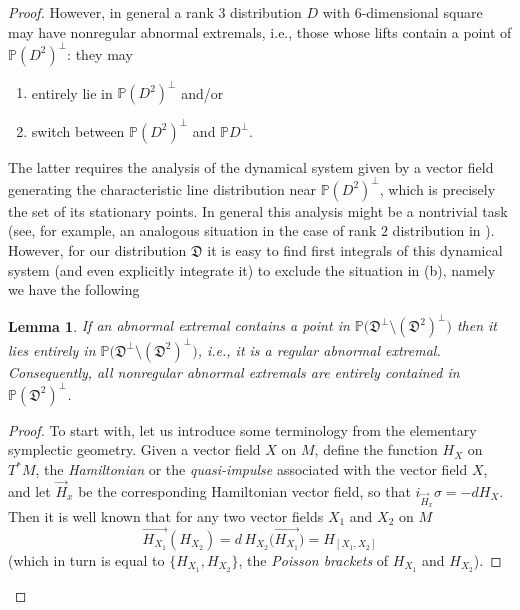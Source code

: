 \documentclass[11pt,letterpaper]{amsart}
\newtheorem{lemma}[theorem]{Lemma}
\numberwithin{equation}{section}
\begin{document}
\begin{proof}
However, in general a rank $3$ distribution $D$ with $6$-dimensional square may have nonregular abnormal extremals, i.e., those whose lifts contain a point of $\mathbb P(D^2)^\perp$: they may 
\begin{enumerate}
\item [(a)] entirely lie in $\mathbb P (D^2)^\perp$ and/or
\item [(b)] switch between $\mathbb P(D^2)^\perp$ and $\mathbb P D^\perp$.
\end{enumerate}
The latter requires the analysis of the dynamical system given by a vector field generating the characteristic line distribution near $\mathbb P(D^2)^\perp$, which is precisely the set of its stationary points. In general this analysis might be a nontrivial task (see, for example, an analogous situation in the case of rank $2$ distribution in \cite{zel99}). However, for our distribution $\mathfrak D$ it is easy to find first integrals of this dynamical system (and even explicitly integrate it) to exclude the situation in (b), namely we have the following
\begin{lemma}
\label{no_b_lemma}
If an abnormal extremal contains a point in $\mathbb P\big(\mathfrak D^\perp\setminus (\mathfrak D^2)^\perp\big)$ then it lies entirely in $\mathbb P\big(\mathfrak D^\perp\setminus (\mathfrak D^2)^\perp\big)$, i.e., it is a regular abnormal extremal. Consequently, all nonregular abnormal extremals are entirely contained in $\mathbb P(\mathfrak D^2)^\perp$. 
\end{lemma}
\begin{proof}
To start with, let us introduce some terminology from the elementary symplectic geometry. Given a vector field $X$ on $M$,  define the function $H_X$ on $T^*M$, the \emph{Hamiltonian} or the \emph{quasi-impulse} associated with the vector field $X$, and let $\vec H_x$ be the corresponding Hamiltonian vector field, so that $i_{\vec H_x}\sigma =-d H_X$. Then it is well known that
for any two vector fields $X_1$ and $X_2$ on $M$  
\begin{equation}
\label{poison1}
\overrightarrow {H_{X_1}} (H_{X_2})= d\, H_{X_2}\bigl(\overrightarrow {H_{X_1}}\bigr) =H_{[X_1, X_2]} 
\end{equation}
(which in turn is equal to $\{H_{X_1}, H_{X_2}\}$, the \emph{Poisson brackets} of $H_{X_1}$ and $H_{X_2}$).



\end{proof}
\end{proof}
\end{document}
